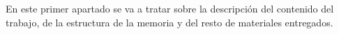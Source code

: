 
En este primer apartado se va a tratar sobre la descripción del contenido del trabajo, de la estructura de la memoria y del resto de materiales entregados.
